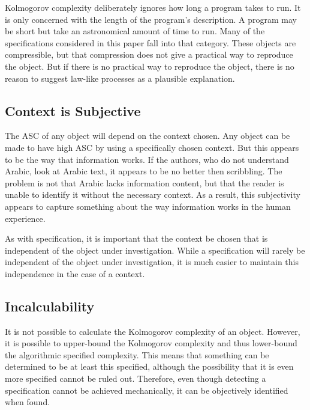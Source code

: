 Kolmogorov complexity deliberately ignores how long a program takes to run.
It is only concerned with the length of the program's description.
A program may be short but take an astronomical amount of time to run.
Many of the specifications considered in this paper fall into that category.
These objects are compressible, but that compression does not give a practical way to reproduce the object.
But if there is no practical way to reproduce the object, there is no reason to suggest law-like processes as a plausible explanation.

\subsection{Context is Subjective}
The ASC of any object will depend on the context chosen.
Any object can be made to have high ASC by using a specifically chosen context.
But this appears to be the way that information works.
If the authors, who do not understand Arabic, look at Arabic text, it appears to be no better then scribbling.
The problem is not that Arabic lacks information content, but that the reader is unable to identify it without the necessary context.
As a result, this subjectivity appears to capture something about the way information works in the human experience.

As with specification, it is important that the context be chosen that is independent of the object under investigation.
While a specification will rarely be independent of the object under investigation, it is much easier to maintain this independence in the case of a context.

\subsection{Incalculability}
It is not possible to calculate the Kolmogorov complexity of an object.
However, it is possible to upper-bound the Kolmogorov complexity and thus lower-bound the algorithmic specified complexity.
This means that something can be determined to be at least this specified, although the possibility that it is even more specified cannot be ruled out.
Therefore, even though detecting a specification cannot be achieved mechanically, it can be objectively identified when found.

